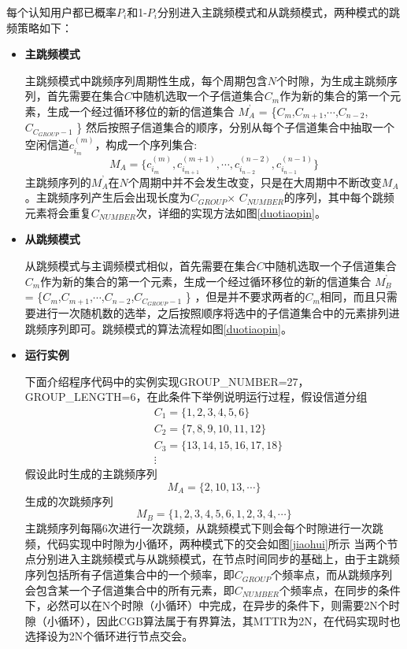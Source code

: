 \documentclass[a4paper,AutoFakeBold,oneside,12pt]{book}
\begin{document}
 
  每个认知用户都已概率$P_i$和1-$P_i$分别进入主跳频模式和从跳频模式，两种模式的跳频策略如下：
  \begin{itemize}
  \item \textbf{主跳频模式}
  
  主跳频模式中跳频序列周期性生成，每个周期包含$N$个时隙，为生成主跳频序列，首先需要在集合$C$中随机选取一个子信道集合$C_m$作为新的集合的第一个元素，生成一个经过循环移位的新的信道集合
$M^{’}_A$ =  \{$C_m$,$C_{m+1}$,$\cdots$,$C_{n-2}$,$C_{C_{GROUP}-1}$ \}
然后按照子信道集合的顺序，分别从每个子信道集合中抽取一个空闲信道$c^{(m)}_{i_m}$，构成一个序列集合:
\begin{equation}
 M_A = \{ c^{(m)}_{i_m},c^{(m+1)}_{i_{m+1}},\cdots,c^{(n-2)}_{i_{n-2}},c^{(n-1)}_{i_{n-1}} \}
 \end{equation}
 主跳频序列的$M^{’}_A$在$N$个周期中并不会发生改变，只是在大周期中不断改变$M_A$ 。主跳频序列产生后会出现长度为$C_{GROUP}$$\times$ $C_{NUMBER}$的序列，其中每个跳频元素将会重复$C_{NUMBER}$次，详细的实现方法如图\ref{duotiaopin}。

   \item \textbf{从跳频模式}
   
   从跳频模式与主调频模式相似，首先需要在集合$C$中随机选取一个子信道集合$C_m$作为新的集合的第一个元素，生成一个经过循环移位的新的信道集合
$M^{’}_B$ =  \{$C_m$,$C_{m+1}$,$\cdots$,$C_{n-2}$,$C_{C_{GROUP}-1}$ \}
，但是并不要求两者的$C_m$相同，而且只需要进行一次随机数的选举，之后按照顺序将选中的子信道集合中的元素排列进跳频序列即可。跳频模式的算法流程如图\ref{duotiaopin}。

  \item \textbf{运行实例}
  
  
  下面介绍程序代码中的实例实现GROUP\_NUMBER=27，GROUP\_LENGTH=6，在此条件下举例说明运行过程，假设信道分组
\begin{equation}
\begin{aligned}
&C_1 = \{ 1,2,3,4,5,6 \} \\
&C_2 = \{7,8,9,10,11,12\}\\
&C_3 = \{ 13,14,15,16,17,18 \}\\
&\vdots 
\end{aligned}
   \end{equation}
   假设此时生成的主跳频序列
   \begin{equation}
 M_A = \{ 2,10,13,\cdots \}
 \end{equation}
 生成的次跳频序列
  \begin{equation}
 M_B = \{ 1,2,3,4,5,6,1,2,3,4,\cdots \}
 \end{equation}
 主跳频序列每隔6次进行一次跳频，从跳频模式下则会每个时隙进行一次跳频，代码实现中时隙为小循环，两种模式下的交会如图\ref{jiaohui}所示
 当两个节点分别进入主跳频模式与从跳频模式，在节点时间同步的基础上，由于主跳频序列包括所有子信道集合中的一个频率，即$C_{GROUP}$个频率点，而从跳频序列会包含某一个子信道集合中的所有元素，即$C_{NUMBER}$个频率点，在同步的条件下，必然可以在N个时隙（小循环）中完成，在异步的条件下，则需要2N个时隙（小循环），因此CGB算法属于有界算法，其MTTR为2N，在代码实现时也选择设为2N个循环进行节点交会。
 \end{itemize}
\end{document}
